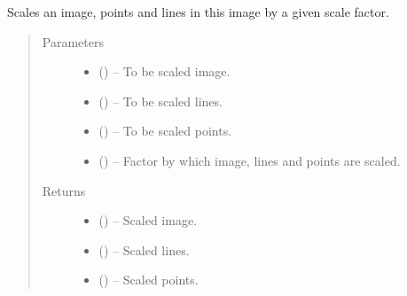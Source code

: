 \documentclass[letterpaper,10pt,english]{sphinxmanual}
\begin{document}
\begin{fulllineitems}
\label{\detokenize{image_helpers:image_helpers.scale_image_lines_points}}
Scales an image, points and lines in this image by a given scale factor.
\begin{quote}\begin{description}
\item[{Parameters}] \leavevmode\begin{itemize}
\item {} 
 () -- To be scaled image.

\item {} 
 () -- To be scaled lines.

\item {} 
 () -- To be scaled points.

\item {} 
 () -- Factor by which image, lines and points are scaled.

\end{itemize}

\item[{Returns}] \leavevmode
\begin{itemize}
\item {} 
 () -- Scaled image.

\item {} 
 () -- Scaled lines.

\item {} 
 () -- Scaled points.

\end{itemize}


\end{description}\end{quote}

\end{fulllineitems}

\end{document}
